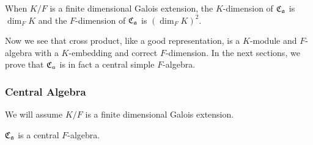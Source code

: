 \begin{corollary}
  \label{cor:dim-cross-product}
  When $K/F$ is a finite dimensional Galois extension, the $K$-dimension of $\operatorname{\mathfrak{C}}_{\mathfrak{a}}$ is $\dim_{F}K$ and the $F$-dimension of $\operatorname{\mathfrak{C}}_{\mathfrak{a}}$ is ${\left(\dim_{F}K\right)}^{2}$.
  \leanok
\end{corollary}

Now we see that cross product, like a good representation, is a $K$-module and $F$-algebra with a $K$-embedding and correct $F$-dimension. In the next sections, we prove that $\operatorname{\mathfrak{C}}_{a}$ is in fact a central simple $F$-algebra.

\subsubsection{Central Algebra}

We will assume $K/F$ is a finite dimensional Galois extension.

\begin{theorem}[Centrality]\label{thm:cross-product-central}
  $\operatorname{\mathfrak{C}}_{\mathfrak{a}}$ is a central $F$-algebra.
  \leanok
\end{theorem}

